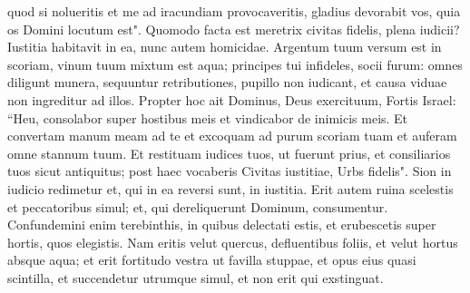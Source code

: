 \begin{biblechapter}
\verse quod si nolueritis et me ad iracundiam provocaveritis, gladius devorabit vos, quia os Domini locutum est". 
\verse Quomodo facta est meretrix civitas fidelis, plena iudicii? Iustitia habitavit in ea, nunc autem homicidae. 
\verse Argentum tuum versum est in scoriam, vinum tuum mixtum est aqua; 
\verse principes tui infideles, socii furum: omnes diligunt munera, sequuntur retributiones, pupillo non iudicant, et causa viduae non ingreditur ad illos. 
\verse Propter hoc ait Dominus, Deus exercituum, Fortis Israel: “Heu, consolabor super hostibus meis et vindicabor de inimicis meis. 
\verse Et convertam manum meam ad te et excoquam ad purum scoriam tuam et auferam omne stannum tuum. 
\verse Et restituam iudices tuos, ut fuerunt prius, et consiliarios tuos sicut antiquitus; post haec vocaberis Civitas iustitiae, Urbs fidelis". 
\verse Sion in iudicio redimetur et, qui in ea reversi sunt, in iustitia. 
\verse Erit autem ruina scelestis et peccatoribus simul; et, qui dereliquerunt Dominum, consumentur. 
\verse Confundemini enim terebinthis, in quibus delectati estis, et erubescetis super hortis, quos elegistis. 
\verse Nam eritis velut quercus, defluentibus foliis, et velut hortus absque aqua; 
\verse et erit fortitudo vestra ut favilla stuppae, et opus eius quasi scintilla, et succendetur utrumque simul, et non erit qui exstinguat. 
\end{biblechapter}

